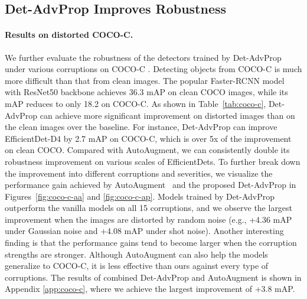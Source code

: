 \documentclass[final]{cvpr}
\begin{document}
\subsection{Det-AdvProp Improves Robustness}
\label{sec:robust}
\paragraph{Results on distorted COCO-C.}
We further evaluate the robustness of the detectors trained by Det-AdvProp under various corruptions on COCO-C \cite{michaelis2020benchmarking}.
Detecting objects from COCO-C is much more difficult than that from clean images.
The popular Faster-RCNN \cite{ren2015faster} model with ResNet50 \cite{he2016resnet} backbone achieves 36.3 mAP on clean COCO images, while its mAP reduces to only 18.2 on COCO-C.
As shown in Table~\ref{tab:coco-c}, Det-AdvProp can achieve more significant improvement on distorted images than on the clean images over the baseline. 
For instance, Det-AdvProp can improve EfficientDet-D4 by 2.7 mAP on COCO-C, which is over 5x of the improvement on clean COCO.
Compared with AutoAugment, we can consistently double its robustness improvement on various scales of EfficientDets.
To further break down the improvement into different corruptions and severities, we visualize the performance gain achieved by AutoAugment~\cite{zoph2019learning} and the proposed Det-AdvProp in Figures~\ref{fig:coco-c-aa} and \ref{fig:coco-c-ap}.
Models trained by Det-AdvProp outperform the vanilla models on all 15 corruptions, and we observe the largest improvement when the images are distorted by random noise (e.g., +4.36 mAP under Gaussian noise and +4.08 mAP under shot noise).
Another interesting finding is that the performance gains tend to become larger when the corruption strengths are stronger.
Although AutoAugment can also help the models generalize to COCO-C, it is less effective than ours against every type of corruptions.
The results of combined Det-AdvProp and AutoAugment is shown in Appendix \ref{app:coco-c}, where we achieve the largest improvement of +3.8 mAP.
\end{document}
